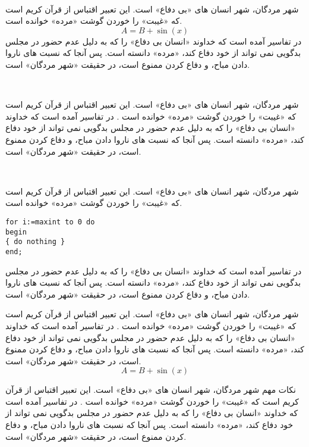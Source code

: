 \documentclass{report}
\begin{document}
‎\ptext[1]
\begin{note}
شهر مردگان، شهر انسان های «بی دفاع» است. این تعبیر اقتباس از قرآن کریم است که «غیبت» را خوردن گوشت «مرده» خوانده است. 
\begin{equation}
A = B + \sin (x)
\end{equation}
در تفاسیر آمده است که خداوند «انسان بی دفاع» را که به دلیل عدم حضور در مجلس بدگویی نمی تواند از خود دفاع کند، «مرده» دانسته است. پس آنجا که نسبت های ناروا دادن مباح، و دفاع کردن ممنوع است، در حقیقت «شهر مردگان» است.
\end{note}
‎\ptext[2]
\begin{problem}
شهر مردگان، شهر انسان های «بی دفاع» است. این تعبیر اقتباس از قرآن کریم است که «غیبت» را خوردن گوشت «مرده» خوانده است . در تفاسیر آمده است که خداوند «انسان بی دفاع» را که به دلیل عدم حضور در مجلس بدگویی نمی تواند از خود دفاع کند، «مرده» دانسته است. پس آنجا که نسبت های ناروا دادن مباح، و دفاع کردن ممنوع است، در حقیقت «شهر مردگان» است.


\end{problem}
‎\ptext[3]
\begin{refer}
شهر مردگان، شهر انسان های «بی دفاع» است. این تعبیر اقتباس از قرآن کریم است که «غیبت» را خوردن گوشت «مرده» خوانده است.
\begin{latin}
\lstset{numbers=none,frame=none}
\begin{lstlisting}
for i:=maxint to 0 do
begin
{ do nothing }
end;
\end{lstlisting}
\end{latin}
  در تفاسیر آمده است که خداوند «انسان بی دفاع» را که به دلیل عدم حضور در مجلس بدگویی نمی تواند از خود دفاع کند، «مرده» دانسته است. پس آنجا که نسبت های ناروا دادن مباح، و دفاع کردن ممنوع است، در حقیقت «شهر مردگان» است.
\end{refer}

\begin{info}
شهر مردگان، شهر انسان های «بی دفاع» است. این تعبیر اقتباس از قرآن کریم است که «غیبت» را خوردن گوشت «مرده» خوانده است . 
در تفاسیر آمده است که خداوند «انسان بی دفاع» را که به دلیل عدم حضور در مجلس بدگویی نمی تواند از خود دفاع کند، «مرده» دانسته است. پس آنجا که نسبت های ناروا دادن مباح، و دفاع کردن ممنوع است، در حقیقت «شهر مردگان» است.
\begin{equation}
A = B + \sin (x)
\end{equation}
\end{info}

\begin{warning}{نکات مهم}
شهر مردگان، شهر انسان های «بی دفاع» است. این تعبیر اقتباس از قرآن کریم است که «غیبت» را خوردن گوشت «مرده» خوانده است . در تفاسیر آمده است که خداوند «انسان بی دفاع» را که به دلیل عدم حضور در مجلس بدگویی نمی تواند از خود دفاع کند، «مرده» دانسته است. پس آنجا که نسبت های ناروا دادن مباح، و دفاع کردن ممنوع است، در حقیقت «شهر مردگان» است.
\end{warning}
\end{document}

